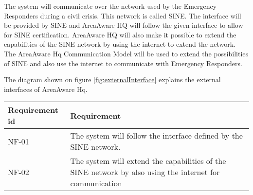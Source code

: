 The system will communicate over the network used by the Emergency Responders during a civil crisis. This network is called SINE. The interface will be provided by SINE and AreaAware HQ will follow the given interface to allow for SINE certification. AreaAware HQ will also make it possible to extend the capabilities of the SINE network by using the internet to extend the network. The AreaAware Hq Communication Model will be used to extend the possibilities of SINE and also use the internet to communicate with Emergency Responders.

The diagram shown on figure \ref{fig:externalInterface} explains the external interfaces of AreaAware Hq.


\begin{longtable}{| p{3.2cm} |  p{10cm} | }
	\hline
	\textbf{Requirement id} &  \textbf{Requirement } \\
	\hline
	NF-01 & The system will follow the interface defined by the SINE network.  \\
	\hline
	NF-02 & The system will extend the capabilities of the SINE network by also using the internet for communication  \\
	\hline
\end{longtable}





